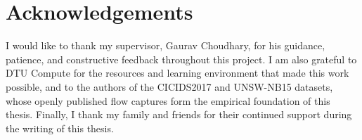 \chapter*{Acknowledgements}

I would like to thank my supervisor, Gaurav Choudhary, for his guidance,
patience, and constructive feedback throughout this project. I am also
grateful to DTU Compute for the resources and learning environment that
made this work possible, and to the authors of the CICIDS2017 and
UNSW-NB15 datasets, whose openly published flow captures form the
empirical foundation of this thesis. Finally, I thank my family and
friends for their continued support during the writing of this thesis.
